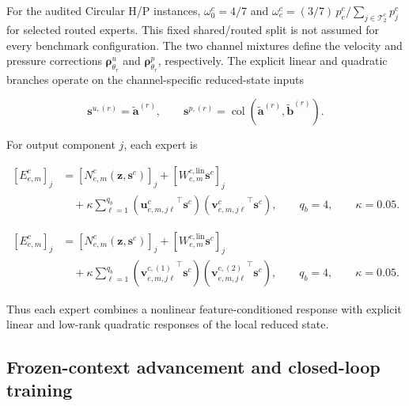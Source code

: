 \documentclass{article}
\providecommand{\DIFaddtex}[1]{{\protect\color{blue} \sf #1}} %
\providecommand{\DIFaddbegin}{} %
\providecommand{\DIFaddend}{} %
\providecommand{\DIFdelbegin}{} %
\providecommand{\DIFdelend}{} %
\providecommand{\DIFadd}[1]{\texorpdfstring{\DIFaddtex{#1}}{#1}} %
\begin{document}
\DIFaddbegin \DIFadd{For the audited Circular H/P instances, $\omega_0^c=4/7$ and
$\omega_e^c=(3/7)\,p_e^c/\sum_{j\in\mathcal T_2^c}p_j^c$ for selected
routed experts. This fixed shared/routed split is not assumed for every
benchmark configuration.
}\DIFaddend The two channel mixtures define the velocity and pressure corrections
$\bm\rho_{\theta_r}^u$ and $\bm\rho_{\theta_r}^p$, respectively. The explicit linear and quadratic branches operate on the channel-specific reduced-state inputs


\begin{equation}
  \bm s^{u,(r)}
  =
  \widetilde{\bm a}^{(r)},
  \qquad
  \bm s^{p,(r)}
  =
  \operatorname{col}
  \left(
    \widetilde{\bm a}^{(r)},
    \widetilde{\bm b}^{(r)}
  \right).
  \label{eq:app_expert_state_slices}
\end{equation}


For output component $j$, each expert is


\DIFdelbegin 
{\color{red}
\begin{align}
  \left[E_{e,m}^c\right]_j
  &=
  \left[
    N_{e,m}^c
    \left(
      \bm z,\bm s^c
    \right)
  \right]_j
  +
  \left[
    W_{e,m}^{c,\mathrm{lin}}
    \bm s^c
  \right]_j
  \nonumber\\
  &\quad+
  \kappa
  \sum_{\ell=1}^{q_b}
  \left(
    {\bm u_{e,m,j\ell}^c}^{\top}
    \bm s^c
  \right)
  \left(
    {\bm v_{e,m,j\ell}^c}^{\top}
    \bm s^c
  \right),
  \qquad
  q_b=4,
  \qquad
  \kappa=0.05.
  \label{old:eq:app_structured_expert}
\end{align}
}
\DIFdelend \DIFaddbegin 
{\color{blue}
\begin{align}
  \left[E_{e,m}^c\right]_j
  &=
  \left[
    N_{e,m}^c
    \left(
      \bm z,\bm s^c
    \right)
  \right]_j
  +
  \left[
    W_{e,m}^{c,\mathrm{lin}}
    \bm s^c
  \right]_j
  \nonumber\\
  &\quad+
  \kappa
  \sum_{\ell=1}^{q_b}
  \left(
    {\bm v_{e,m,j\ell}^{c,(1)}}^{\top}
    \bm s^c
  \right)
  \left(
    {\bm v_{e,m,j\ell}^{c,(2)}}^{\top}
    \bm s^c
  \right),
  \qquad
  q_b=4,
  \qquad
  \kappa=0.05.
  \label{eq:app_structured_expert}
\end{align}
}
\DIFaddend 


Thus each expert combines a nonlinear feature-conditioned response with
explicit linear and low-rank quadratic responses of the local reduced state.


\subsection{Frozen-context advancement and closed-loop training}
\end{document}
